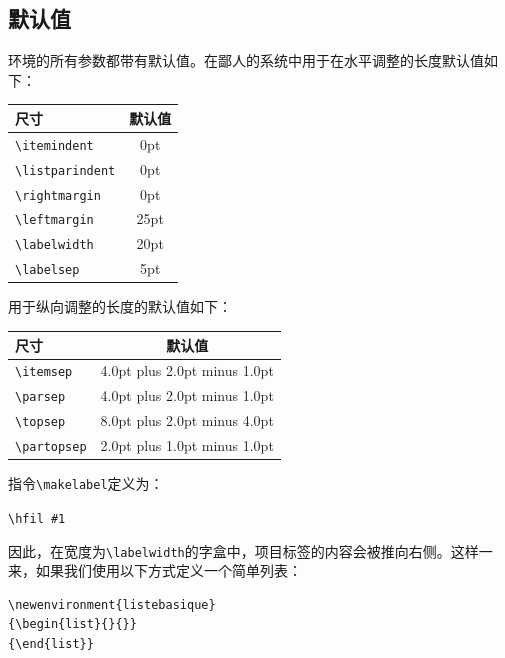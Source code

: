 \subsection{默认值}

环境的所有参数都带有默认值。在鄙人的系统中用于在水平调整的长度默认值如下：

\begin{center}
  \begin{tabular}{|l|c|}
    \hline
    尺寸 & 默认值\\
    \hline
    \verb+\itemindent+    &0pt\\
    \verb+\listparindent+ &0pt\\
    \verb+\rightmargin+   &0pt\\
    \verb+\leftmargin+    &25pt\\
    \verb+\labelwidth+    &20pt\\
    \verb+\labelsep+      &5pt\\
    \hline
  \end{tabular}
\end{center}

用于纵向调整的长度的默认值如下：

\begin{center}
  \begin{tabular}{|l|c|}
    \hline
    尺寸 & 默认值\\
    \hline 
    \verb+\itemsep+       &4.0pt plus 2.0pt minus 1.0pt\\
    \verb+\parsep+        &4.0pt plus 2.0pt minus 1.0pt\\
    \verb+\topsep+        &8.0pt plus 2.0pt minus 4.0pt\\
    \verb+\partopsep+     &2.0pt plus 1.0pt minus 1.0pt\\
    \hline
  \end{tabular}
\end{center}

指令\verb|\makelabel|定义为：

\begin{dmd}
\verb+\hfil #1+
\end{dmd}

因此，在宽度为\verb|\labelwidth|的字盒中，项目标签的内容会被推向右侧。这样一来，如果我们使用以下方式定义一个简单列表：

\begin{dmd}
\begin{verbatim}
\newenvironment{listebasique}
{\begin{list}{}{}}
{\end{list}}
\end{verbatim}
\end{dmd}

